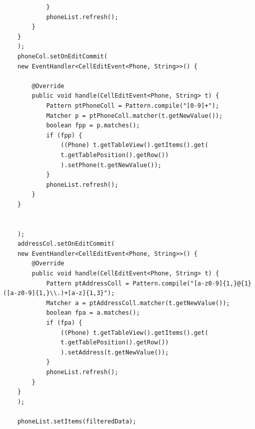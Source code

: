 \begin{enumerate}
\begin{verbatim}
			}
			phoneList.refresh();
		}
	}
	);
	phoneCol.setOnEditCommit(
	new EventHandler<CellEditEvent<Phone, String>>() {
		
		@Override
		public void handle(CellEditEvent<Phone, String> t) {
			Pattern ptPhoneColl = Pattern.compile("[0-9]+");
			Matcher p = ptPhoneColl.matcher(t.getNewValue());
			boolean fpp = p.matches();
			if (fpp) {
				((Phone) t.getTableView().getItems().get(
				t.getTablePosition().getRow())
				).setPhone(t.getNewValue());
			}
			phoneList.refresh();
		}
	}
	
	
	);
	addressCol.setOnEditCommit(
	new EventHandler<CellEditEvent<Phone, String>>() {
		@Override
		public void handle(CellEditEvent<Phone, String> t) {
			Pattern ptAddressColl = Pattern.compile("[a-z0-9]{1,}@{1}([a-z0-9]{1,}\\.)+[a-z]{1,3}");
			Matcher a = ptAddressColl.matcher(t.getNewValue());
			boolean fpa = a.matches();
			if (fpa) {
				((Phone) t.getTableView().getItems().get(
				t.getTablePosition().getRow())
				).setAddress(t.getNewValue());
			}
			phoneList.refresh();
		}
	}
	);
	
	phoneList.setItems(filteredData);
	

\end{verbatim}
\end{enumerate}
